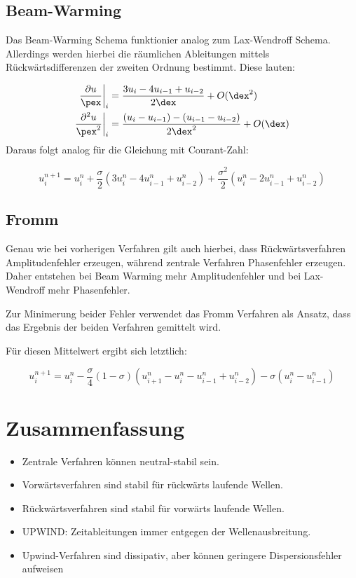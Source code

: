 \subsection{Beam-Warming}
Das Beam-Warming Schema funktionier analog zum Lax-Wendroff Schema. Allerdings werden hierbei die r\"aumlichen Ableitungen mittels R\"uckw\"artsdifferenzen der zweiten Ordnung bestimmt. Diese lauten:
\par
\begin{align*}
	\frac{\partial u}{\pex}\bigg|_i &= \frac{3u_i - 4u_{i-1} + u_{i-2}}{2\dex} + O(\dex^2) \\
	\frac{\partial^2 u}{\pex^2}\bigg|_i &= \frac{(u_i - u_{i-1}) -  (u_{i-1} - u_{i-2})}{2\dex^2} + O(\dex)
\end{align*}
Daraus folgt analog f\"ur die Gleichung mit Courant-Zahl:
\par
\begin{equation*}
	u_i^{n+1} = u_i^n + \frac{\sigma}{2}(3u^n_i - 4u^n_{i-1} + u^n_{i-2}) + \frac{\sigma^2}{2}(u^n_{i} - 2u^n_{i-1} + u^n_{i-2}) 
\end{equation*}

\subsection{Fromm}
Genau wie bei vorherigen Verfahren gilt auch hierbei, dass R\"uckw\"artsverfahren Amplitudenfehler erzeugen, w\"ahrend zentrale Verfahren Phasenfehler erzeugen. Daher entstehen bei Beam Warming mehr Amplitudenfehler und bei Lax-Wendroff mehr Phasenfehler.
\par
Zur Minimerung beider Fehler verwendet das Fromm Verfahren als Ansatz, dass das Ergebnis der beiden Verfahren gemittelt wird.
\par
F\"ur diesen Mittelwert ergibt sich letztlich:
\par
\begin{equation*}
	u^{n+1}_i = u^n_i - \frac{\sigma}{4}(1-\sigma)(u^n_{i+1} - u^n_i - u^n_{i-1} + u^n_{i-2}) - \sigma (u^n_i - u^n_{i-1})
\end{equation*}


\section{Zusammenfassung}
\begin{itemize}
	\item Zentrale Verfahren k\"onnen neutral-stabil sein.
	\item Vorw\"artsverfahren sind stabil f\"ur r\"uckw\"arts laufende Wellen.
	\item R\"uckw\"artsverfahren sind stabil f\"ur vorw\"arts laufende Wellen.
	\item UPWIND: Zeitableitungen immer entgegen der Wellenausbreitung.
	\item Upwind-Verfahren sind dissipativ, aber k\"onnen geringere Dispersionsfehler aufweisen
\end{itemize}
